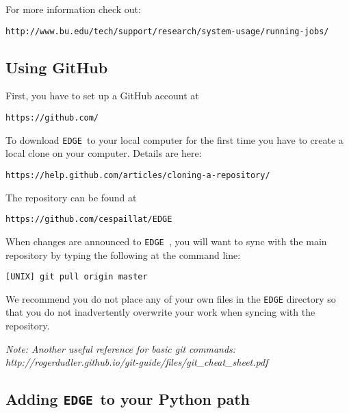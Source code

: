\documentclass{article}
\newcommand{\edge}{\texttt{EDGE }}
\begin{document}
\noindent For more information check out:

\vspace{2mm}
\texttt{http://www.bu.edu/tech/support/research/system-usage/running-jobs/}
\vspace{2mm}

\subsection{Using GitHub} \label{github}

First, you have to set up a GitHub account at 

\vspace{2mm}
\texttt{https://github.com/}
\vspace{2mm}

\noindent To download \edge to your local computer for the first time you have to create a local clone on your computer.  Details are here: 

\vspace{2mm}
\texttt{https://help.github.com/articles/cloning-a-repository/}
\vspace{2mm}

\noindent The repository can be found at

\vspace{2mm}
\texttt{https://github.com/cespaillat/EDGE}
\vspace{2mm}

\noindent When changes are announced to \edge, you will want to sync with the main repository by typing the following at the command line:

\vspace{2mm}
\texttt{[UNIX] git pull origin master}
\vspace{2mm}

\noindent We recommend you do not place any of your own files in the \texttt{EDGE} directory so that you do not inadvertently overwrite your work when syncing with the repository.

\vspace{2mm}

\noindent \textit{Note: Another useful reference for basic git commands: http://rogerdudler.github.io/git-guide/files/git\_cheat\_sheet.pdf}

\subsection{Adding \edge to your Python path} \label{addingedgetopath}
\end{document}
